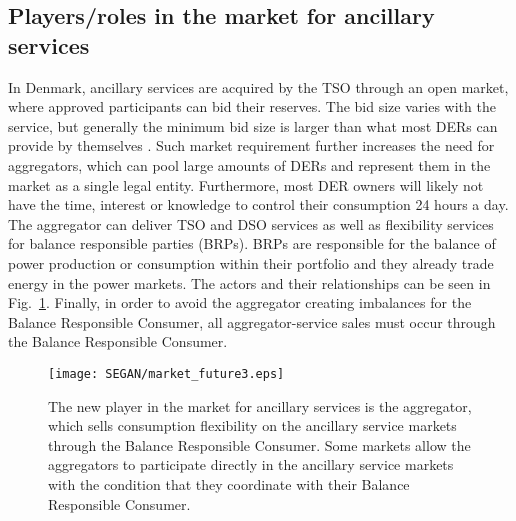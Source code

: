 \subsection{Players/roles in the market for ancillary services}
In Denmark, ancillary services are acquired by the TSO through an open market, where approved participants can bid their reserves. The bid size varies with the service, but generally the minimum bid size is larger than what most DERs can provide by themselves \cite{EnerginetAncillary}. Such market requirement further increases the need for aggregators, which can pool large amounts of DERs and represent them in the market as a single legal entity. Furthermore, most DER owners will likely not have the time, interest or knowledge to control their consumption 24 hours a day. 
The aggregator can deliver TSO and DSO services as well as flexibility services for balance responsible parties (BRPs). BRPs are responsible for the balance of power production or consumption within their portfolio and they already trade energy in the power markets. The actors and their relationships can be seen in Fig.~\ref{fig:SEGANmarket}. Finally, in order to avoid the aggregator creating imbalances for the Balance Responsible Consumer, all aggregator-service sales must occur through the Balance Responsible Consumer. 
\begin{figure}
  \centering
  \texttt{[image: SEGAN/market\_future3.eps]}
  \caption{The new player in the market for ancillary services is the aggregator, which sells consumption flexibility on the ancillary service markets through the Balance Responsible Consumer. Some markets allow the aggregators to participate directly in the ancillary service markets with the condition that they coordinate with their Balance Responsible Consumer.}
  \label{fig:SEGANmarket}
\end{figure}
